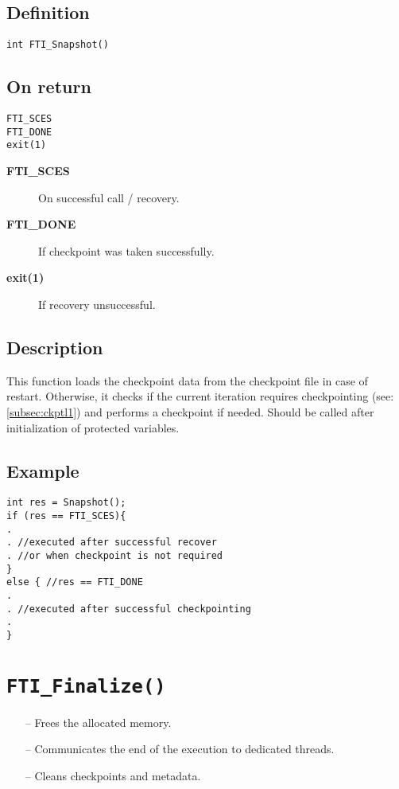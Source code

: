 \documentclass{refrep}
\begin{document}
\subsection*{Definition}
\begin{lstlisting}[frame=single]
int FTI_Snapshot()
\end{lstlisting}
\subsection*{On return}
\begin{lstlisting}[frame=single]
FTI_SCES
FTI_DONE
exit(1)
\end{lstlisting}
\begin{description}
\item[\textbf{FTI\_SCES}] On successful call / recovery.
\item[\textbf{FTI\_DONE}] If checkpoint was taken successfully.
\item[\textbf{exit(1)}] If recovery unsuccessful.
\end{description}
\subsection*{Description}
This function loads the checkpoint data from the checkpoint file in case of restart. Otherwise, it checks if the current iteration requires checkpointing (see: \ref{subsec:ckptl1}) and performs a checkpoint if needed. Should be called after initialization of protected variables.
\subsection*{Example}
\begin{center}
\begin{lstlisting}[frame=single]
int res = Snapshot();
if (res == FTI_SCES){
.
. //executed after successful recover
. //or when checkpoint is not required
}
else { //res == FTI_DONE
.
. //executed after successful checkpointing
.
}

\end{lstlisting}
\end{center}
\newpage
\section{\tt FTI\_Finalize()}\label{sec:ftifinalize}
\begin{framed}
\begin{itemize}
\item[--] Frees the allocated memory.
\item[--] Communicates the end of the execution to dedicated threads.
\item[--] Cleans checkpoints and metadata.
\end{itemize}
\end{framed}
\end{document}
